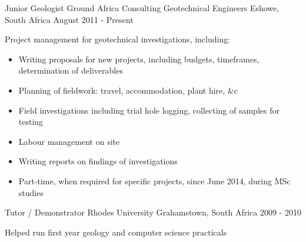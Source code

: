 \begin{cventries}
\cventry
{Junior Geologist} %
{Ground Africa Consulting Geotechnical Engineers} %
{Eshowe, South Africa} %
{August 2011 - Present} %
{ %
\begin{cvitems}
\item {Project management for geotechnical investigations, including:
\begin{itemize}
\item {Writing proposals for new projects, including budgets, timeframes, determination of deliverables}
\item {Planning of fieldwork: travel, accommodation, plant hire, \&c}
\item {Field investigations including trial hole logging, collecting of samples for testing}
\item {Labour management on site}
\item {Writing reports on findings of investigations}
\item {Part-time, when required for specific projects, since June 2014, during MSc studies}
\end{itemize}
}
\end{cvitems}
}


\cventry
{Tutor / Demonstrator} %
{Rhodes University} %
{Grahamstown, South Africa} %
{2009 - 2010} %
{ %
\begin{cvitems}
\item {Helped run first year geology and computer science practicals}
\end{cvitems}
}


\end{cventries}
